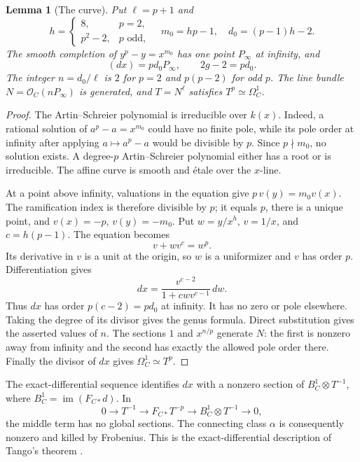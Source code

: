 \documentclass[11pt,a4paper]{article}
\newcommand{\OO}{\mathcal O}
\newtheorem{lemma}[theorem]{Lemma}
\theoremstyle{definition}\newtheorem{definition}[theorem]{Definition}
\theoremstyle{remark}\newtheorem{remark}[theorem]{Remark}
\numberwithin{equation}{section}
\begin{document}
\begin{lemma}[The curve]\label{lem:curve}
Put $\ell=p+1$ and
\[
 h=\begin{cases}8,&p=2,\\p^2-2,&p\text{ odd},\end{cases}
 \quad m_0=hp-1,\quad d_0=(p-1)h-2.
\]
The smooth completion of $y^p-y=x^{m_0}$ has one point $P_\infty$ at infinity, and
\[
 (dx)=pd_0P_\infty,\qquad 2g-2=pd_0.
\]
The integer $n=d_0/\ell$ is $2$ for $p=2$ and $p(p-2)$ for odd $p$. The line bundle $N=\OO_C(nP_\infty)$ is generated, and $T=N^\ell$ satisfies $T^p\simeq\Omega_C^1$.
\end{lemma}
\begin{proof}
The Artin--Schreier polynomial is irreducible over $k(x)$. Indeed, a rational solution of $a^p-a=x^{m_0}$ could have no finite pole, while its pole order at infinity after applying $a\mapsto a^p-a$ would be divisible by $p$. Since $p\nmid m_0$, no solution exists. A degree-$p$ Artin--Schreier polynomial either has a root or is irreducible. The affine curve is smooth and étale over the $x$-line.

At a point above infinity, valuations in the equation give $p\,v(y)=m_0v(x)$. The ramification index is therefore divisible by $p$; it equals $p$, there is a unique point, and $v(x)=-p$, $v(y)=-m_0$. Put $w=y/x^h$, $v=1/x$, and $c=h(p-1)$. The equation becomes
\[
 v+wv^c=w^p.
\]
Its derivative in $v$ is a unit at the origin, so $w$ is a uniformizer and $v$ has order $p$. Differentiation gives
\[
 dx=\frac{v^{c-2}}{1+cwv^{c-1}}\,dw.
\]
Thus $dx$ has order $p(c-2)=pd_0$ at infinity. It has no zero or pole elsewhere. Taking the degree of its divisor gives the genus formula. Direct substitution gives the asserted values of $n$. The sections $1$ and $x^{n/p}$ generate $N$: the first is nonzero away from infinity and the second has exactly the allowed pole order there. Finally the divisor of $dx$ gives $\Omega_C^1\simeq T^p$.
\end{proof}

The exact-differential sequence identifies $dx$ with a nonzero section of $B_C^1\otimes T^{-1}$, where $B_C^1=\operatorname{im}(F_{C*}d)$. In
\[
 0\longrightarrow T^{-1}\longrightarrow F_{C*}T^{-p}
                 \longrightarrow B_C^1\otimes T^{-1}\longrightarrow0,
\]
the middle term has no global sections. The connecting class $\alpha$ is consequently nonzero and killed by Frobenius. This is the exact-differential description of Tango's theorem \citep[Theorem 1.2 and Lemma 1.4, pp.~3--4 of the preprint]{Mukai}.
\end{document}
